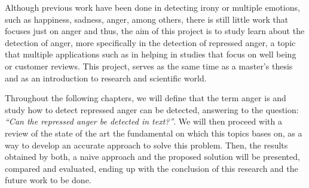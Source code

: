 Although previous work have been done in detecting irony or multiple emotions, such as happiness, sadness, anger, among others, there is still little work that focuses just on anger and thus, the aim of this project is to study learn about the detection of anger, more specifically in the detection of repressed anger, a topic that multiple applications such as in helping in studies that focus on well being or customer reviews. This project, serves as the same time as a master's thesis and as an introduction to research and scientific world.

Throughout the following chapters, we will define that the term anger is and study how to detect repressed anger can be detected, answering to the question: \textit{``Can the repressed anger be detected in text?''}. We will then proceed with a review of the state of the art the fundamental on which this topics bases on, as a way to develop an accurate approach to solve this problem. Then, the results obtained by both, a naive approach and the proposed solution will be presented, compared and evaluated, ending up with the conclusion of this research and the future work to be done.

\iffalse

